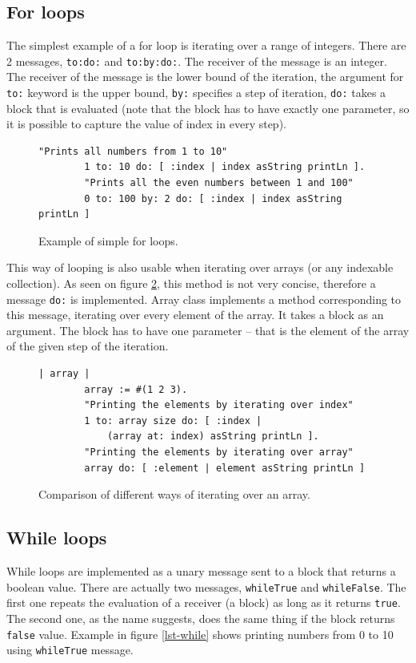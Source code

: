\documentclass[thesis=M,english]{FITthesis}[2019/12/23]
\begin{document}
\subsection{For loops}
The simplest example of a for loop is iterating over a range of integers. There are 2 messages, \texttt{to:do:} and  \texttt{to:by:do:}.
The receiver of the message is an integer. The receiver of the message is the lower bound of the iteration, the argument for \texttt{to:}
keyword is the upper bound, \texttt{by:} specifies a step of iteration, \texttt{do:} takes a block that is evaluated (note that the block
has to have exactly one parameter, so it is possible to capture the value of index in every step).

\begin{figure}[h!]
	\begin{lstlisting}[language=Smalltalk]
		"Prints all numbers from 1 to 10"
		1 to: 10 do: [ :index | index asString printLn ].
		"Prints all the even numbers between 1 and 100"
		0 to: 100 by: 2 do: [ :index | index asString printLn ]
	\end{lstlisting}
	\caption{Example of simple for loops.}
	\label{lst-for-index}
\end{figure}

This way of looping is also usable when iterating over arrays (or any indexable collection). As seen on figure \ref{lst-for-array}, this method is not
very concise, therefore a message \texttt{do:} is implemented. Array class implements a method corresponding to this message, iterating
over every element of the array. It takes a block as an argument. The block has to have one parameter -- that is the element of the array
of the given step of the iteration.

\begin{figure}[h!]
	\begin{lstlisting}[language=Smalltalk]
		| array |
		array := #(1 2 3).
		"Printing the elements by iterating over index"
		1 to: array size do: [ :index |
			(array at: index) asString printLn ].
		"Printing the elements by iterating over array"
		array do: [ :element | element asString printLn ]
	\end{lstlisting}
	\caption{Comparison of different ways of iterating over an array.}
	\label{lst-for-array}
\end{figure}

\subsection{While loops}
While loops are implemented as a unary message sent to a block that returns a boolean value. There are actually
two messages, \texttt{whileTrue} and \texttt{whileFalse}. The first one repeats the evaluation of a receiver (a block)
as long as it returns \texttt{true}. The second one, as the name suggests, does the same thing if the block returns
\texttt{false} value. Example in figure \ref{lst-while} shows printing numbers from 0 to 10 using \texttt{whileTrue}
message.
\end{document}
